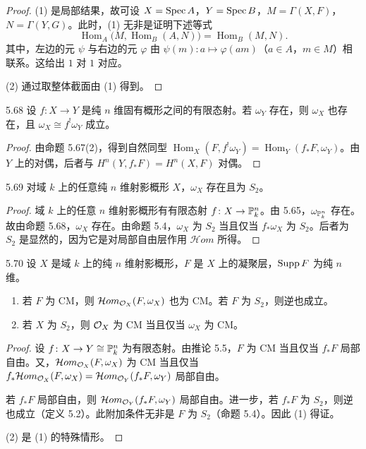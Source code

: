 \begin{proof}
(1) 是局部结果，故可设 $X=\operatorname{Spec} A$，$Y=\operatorname{Spec} B$，$M=\Gamma(X,F)$，$N=\Gamma(Y,G)$。此时，(1) 无非是证明下述等式
\[
\operatorname{Hom}_A\bigl(M,\operatorname{Hom}_B(A,N)\bigr)=\operatorname{Hom}_B(M,N).
\]
其中，左边的元 $\psi$ 与右边的元 $\varphi$ 由 $\psi(m)\colon a\mapsto\varphi(am)$（$a\in A$，$m\in M$）相联系。这给出 $1$ 对 $1$ 对应。

(2) 通过取整体截面由 (1) 得到。
\end{proof}

\begin{propositionp}{5.68}
设 $f\colon X\to Y$ 是纯 $n$ 维固有概形之间的有限态射。若 $\omega_Y$ 存在，则 $\omega_X$ 也存在，且 $\omega_X\cong f^!\omega_Y$ 成立。
\end{propositionp}

\begin{proof}
由命题 5.67(2)，得到自然同型 $\operatorname{Hom}_X(F,f^!\omega_Y)=\operatorname{Hom}_Y(f_*F,\omega_Y)$。由 $Y$ 上的对偶，后者与 $H^n(Y,f_*F)=H^n(X,F)$ 对偶。
\end{proof}

\begin{corollaryp}{5.69}
对域 $k$ 上的任意纯 $n$ 维射影概形 $X$，$\omega_X$ 存在且为 $S_2$。
\end{corollaryp}

\begin{proof}
域 $k$ 上的任意 $n$ 维射影概形有有限态射 $f\colon X\to\mathbb{P}^n_k$。由 5.65，$\omega_{\mathbb{P}^n_k}$ 存在。故由命题 5.68，$\omega_X$ 存在。由命题 5.4，$\omega_X$ 为 $S_2$ 当且仅当 $f_*\omega_X$ 为 $S_2$。后者为 $S_2$ 是显然的，因为它是对局部自由层作用 $\mathcal{H}om$ 所得。
\end{proof}

\begin{corollaryp}{5.70}
设 $X$ 是域 $k$ 上的纯 $n$ 维射影概形，$F$ 是 $X$ 上的凝聚层，$\operatorname{Supp} F$ 为纯 $n$ 维。
\begin{enumerate}[label=(\arabic*),leftmargin=*]
\item 若 $F$ 为 CM，则 $\mathcal{H}om_{\mathcal{O}_X}(F,\omega_X)$ 也为 CM。若 $F$ 为 $S_2$，则逆也成立。
\item 若 $X$ 为 $S_2$，则 $\mathcal{O}_X$ 为 CM 当且仅当 $\omega_X$ 为 CM。
\end{enumerate}
\end{corollaryp}

\begin{proof}
设 $f\colon X\to Y\cong\mathbb{P}^n_k$ 为有限态射。由推论 5.5，$F$ 为 CM 当且仅当 $f_*F$ 局部自由。又，$\mathcal{H}om_{\mathcal{O}_X}(F,\omega_X)$ 为 CM 当且仅当 $f_*\mathcal{H}om_{\mathcal{O}_X}(F,\omega_X)=\mathcal{H}om_{\mathcal{O}_Y}(f_*F,\omega_Y)$ 局部自由。

若 $f_*F$ 局部自由，则 $\mathcal{H}om_{\mathcal{O}_Y}(f_*F,\omega_Y)$ 局部自由。进一步，若 $f_*F$ 为 $S_2$，则逆也成立（定义 5.2）。此附加条件无非是 $F$ 为 $S_2$（命题 5.4）。因此 (1) 得证。

(2) 是 (1) 的特殊情形。
\end{proof}

